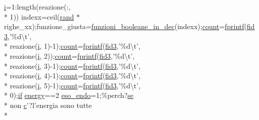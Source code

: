 \begin{DoxyCompactItemize}
\hyperlink{a00113_ad3efca1ea6e3333daf30719ee0501862}{i}=1\+:length(reazione(\+:, \\*
1)) indexx=ceil(\hyperlink{a00112_a078f67f8fbdd9ac6587e03bdf2651d32}{rand} $\ast$righe\+\_\+xx);funzione\+\_\+giusta=\hyperlink{a00113_aca80ac3e93dabd95e623a51f90fb37b6}{funzioni\+\_\+booleane\+\_\+in\+\_\+dec}(indexx);\hyperlink{a00110_aa0a4866d2600caeb20cfacee8eefc922}{count}=\hyperlink{a00110_aa6dc40efe43a338c9ff278260d95b4d9}{fprintf}(\hyperlink{a00110_a153e3250d4161f9bea4c140498016d94}{fid3},'\%d\textbackslash{}t', \\*
reazione(\hyperlink{a00113_ad3efca1ea6e3333daf30719ee0501862}{i}, 1)-\/1);\hyperlink{a00110_aa0a4866d2600caeb20cfacee8eefc922}{count}=\hyperlink{a00110_aa6dc40efe43a338c9ff278260d95b4d9}{fprintf}(\hyperlink{a00110_a153e3250d4161f9bea4c140498016d94}{fid3},'\%d\textbackslash{}t', \\*
reazione(\hyperlink{a00113_ad3efca1ea6e3333daf30719ee0501862}{i}, 2));\hyperlink{a00110_aa0a4866d2600caeb20cfacee8eefc922}{count}=\hyperlink{a00110_aa6dc40efe43a338c9ff278260d95b4d9}{fprintf}(\hyperlink{a00110_a153e3250d4161f9bea4c140498016d94}{fid3},'\%d\textbackslash{}t', \\*
reazione(\hyperlink{a00113_ad3efca1ea6e3333daf30719ee0501862}{i}, 3)-\/1);\hyperlink{a00110_aa0a4866d2600caeb20cfacee8eefc922}{count}=\hyperlink{a00110_aa6dc40efe43a338c9ff278260d95b4d9}{fprintf}(\hyperlink{a00110_a153e3250d4161f9bea4c140498016d94}{fid3},'\%d\textbackslash{}t', \\*
reazione(\hyperlink{a00113_ad3efca1ea6e3333daf30719ee0501862}{i}, 4)-\/1);\hyperlink{a00110_aa0a4866d2600caeb20cfacee8eefc922}{count}=\hyperlink{a00110_aa6dc40efe43a338c9ff278260d95b4d9}{fprintf}(\hyperlink{a00110_a153e3250d4161f9bea4c140498016d94}{fid3},'\%d\textbackslash{}t', \\*
reazione(\hyperlink{a00113_ad3efca1ea6e3333daf30719ee0501862}{i}, 5)-\/1);\hyperlink{a00110_aa0a4866d2600caeb20cfacee8eefc922}{count}=\hyperlink{a00110_aa6dc40efe43a338c9ff278260d95b4d9}{fprintf}(\hyperlink{a00110_a153e3250d4161f9bea4c140498016d94}{fid3},'\%d\textbackslash{}t', \\*
0);\hyperlink{a00030_a01d55766b8058903dd360b4bda71f9f5}{if} \hyperlink{a00113_ac002779c383d2cc783e881f94449de66}{energy}==2 \hyperlink{a00110_aad3b1a68f41f4a6fa247c1cf8e1d450a}{eso\+\_\+endo}=1;\%perch?\hyperlink{a00113_a99032f27eaf45da350b544c68aa6467c}{se} \\*
non \hyperlink{a00035_a6be92348ba85ef257b11d06209e1d7b6}{c}'?l'energia sono tutte \\*

\end{DoxyCompactItemize}
